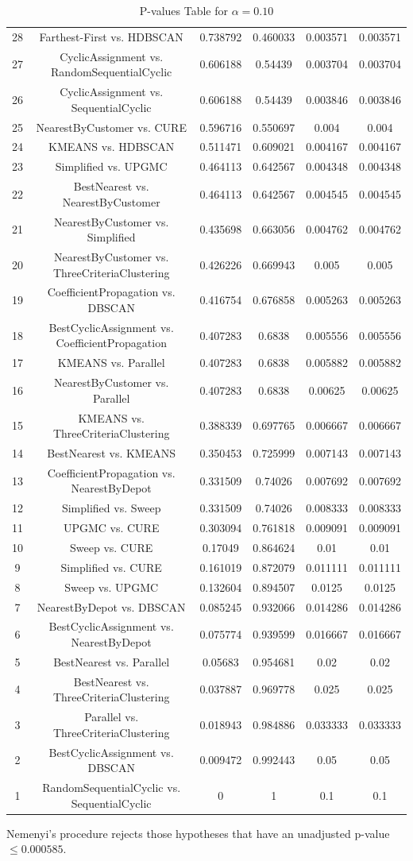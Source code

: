 \documentclass[a4paper,10pt]{article}
\begin{document}
\begin{landscape}
\begin{table}[!htp]
\begin{tabular}{cccccc}
28&Farthest-First vs. HDBSCAN&0.738792&0.460033&0.003571&0.003571\\
27&CyclicAssignment vs. RandomSequentialCyclic&0.606188&0.54439&0.003704&0.003704\\
26&CyclicAssignment vs. SequentialCyclic&0.606188&0.54439&0.003846&0.003846\\
25&NearestByCustomer vs. CURE&0.596716&0.550697&0.004&0.004\\
24&KMEANS vs. HDBSCAN&0.511471&0.609021&0.004167&0.004167\\
23&Simplified vs. UPGMC&0.464113&0.642567&0.004348&0.004348\\
22&BestNearest vs. NearestByCustomer&0.464113&0.642567&0.004545&0.004545\\
21&NearestByCustomer vs. Simplified&0.435698&0.663056&0.004762&0.004762\\
20&NearestByCustomer vs. ThreeCriteriaClustering&0.426226&0.669943&0.005&0.005\\
19&CoefficientPropagation vs. DBSCAN&0.416754&0.676858&0.005263&0.005263\\
18&BestCyclicAssignment vs. CoefficientPropagation&0.407283&0.6838&0.005556&0.005556\\
17&KMEANS vs. Parallel&0.407283&0.6838&0.005882&0.005882\\
16&NearestByCustomer vs. Parallel&0.407283&0.6838&0.00625&0.00625\\
15&KMEANS vs. ThreeCriteriaClustering&0.388339&0.697765&0.006667&0.006667\\
14&BestNearest vs. KMEANS&0.350453&0.725999&0.007143&0.007143\\
13&CoefficientPropagation vs. NearestByDepot&0.331509&0.74026&0.007692&0.007692\\
12&Simplified vs. Sweep&0.331509&0.74026&0.008333&0.008333\\
11&UPGMC vs. CURE&0.303094&0.761818&0.009091&0.009091\\
10&Sweep vs. CURE&0.17049&0.864624&0.01&0.01\\
9&Simplified vs. CURE&0.161019&0.872079&0.011111&0.011111\\
8&Sweep vs. UPGMC&0.132604&0.894507&0.0125&0.0125\\
7&NearestByDepot vs. DBSCAN&0.085245&0.932066&0.014286&0.014286\\
6&BestCyclicAssignment vs. NearestByDepot&0.075774&0.939599&0.016667&0.016667\\
5&BestNearest vs. Parallel&0.05683&0.954681&0.02&0.02\\
4&BestNearest vs. ThreeCriteriaClustering&0.037887&0.969778&0.025&0.025\\
3&Parallel vs. ThreeCriteriaClustering&0.018943&0.984886&0.033333&0.033333\\
2&BestCyclicAssignment vs. DBSCAN&0.009472&0.992443&0.05&0.05\\
1&RandomSequentialCyclic vs. SequentialCyclic&0&1&0.1&0.1\\
\hline
\end{tabular}
\caption{P-values Table for $\alpha=0.10$}
\end{table}Nemenyi's procedure rejects those hypotheses that have an unadjusted p-value $\le0.000585$.


\end{landscape}
\end{document}

